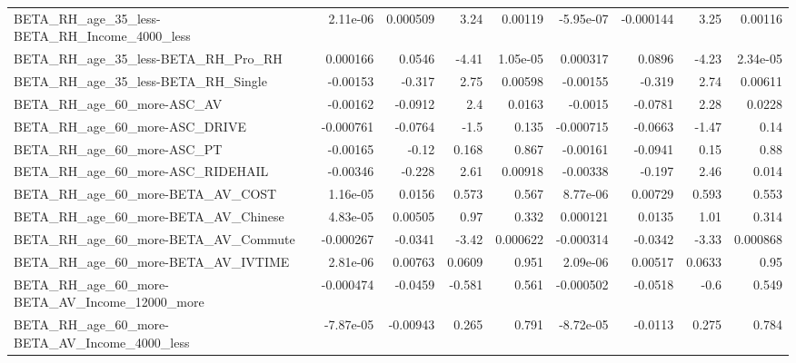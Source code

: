 \begin{tabular}{lrrrrrrrr}
BETA\_RH\_age\_35\_less-BETA\_RH\_Income\_4000\_less       &    2.11e-06 &     0.000509 &      3.24 &  0.00119 &  -5.95e-07 &   -0.000144 &         3.25 &       0.00116 \\
BETA\_RH\_age\_35\_less-BETA\_RH\_Pro\_RH                 &    0.000166 &       0.0546 &     -4.41 & 1.05e-05 &   0.000317 &      0.0896 &        -4.23 &      2.34e-05 \\
BETA\_RH\_age\_35\_less-BETA\_RH\_Single                 &    -0.00153 &       -0.317 &      2.75 &  0.00598 &   -0.00155 &      -0.319 &         2.74 &       0.00611 \\
BETA\_RH\_age\_60\_more-ASC\_AV                         &    -0.00162 &      -0.0912 &       2.4 &   0.0163 &    -0.0015 &     -0.0781 &         2.28 &        0.0228 \\
BETA\_RH\_age\_60\_more-ASC\_DRIVE                      &   -0.000761 &      -0.0764 &      -1.5 &    0.135 &  -0.000715 &     -0.0663 &        -1.47 &          0.14 \\
BETA\_RH\_age\_60\_more-ASC\_PT                         &    -0.00165 &        -0.12 &     0.168 &    0.867 &   -0.00161 &     -0.0941 &         0.15 &          0.88 \\
BETA\_RH\_age\_60\_more-ASC\_RIDEHAIL                   &    -0.00346 &       -0.228 &      2.61 &  0.00918 &   -0.00338 &      -0.197 &         2.46 &         0.014 \\
BETA\_RH\_age\_60\_more-BETA\_AV\_COST                   &    1.16e-05 &       0.0156 &     0.573 &    0.567 &   8.77e-06 &     0.00729 &        0.593 &         0.553 \\
BETA\_RH\_age\_60\_more-BETA\_AV\_Chinese                &    4.83e-05 &      0.00505 &      0.97 &    0.332 &   0.000121 &      0.0135 &         1.01 &         0.314 \\
BETA\_RH\_age\_60\_more-BETA\_AV\_Commute                &   -0.000267 &      -0.0341 &     -3.42 & 0.000622 &  -0.000314 &     -0.0342 &        -3.33 &      0.000868 \\
BETA\_RH\_age\_60\_more-BETA\_AV\_IVTIME                 &    2.81e-06 &      0.00763 &    0.0609 &    0.951 &   2.09e-06 &     0.00517 &       0.0633 &          0.95 \\
BETA\_RH\_age\_60\_more-BETA\_AV\_Income\_12000\_more      &   -0.000474 &      -0.0459 &    -0.581 &    0.561 &  -0.000502 &     -0.0518 &         -0.6 &         0.549 \\
BETA\_RH\_age\_60\_more-BETA\_AV\_Income\_4000\_less       &   -7.87e-05 &     -0.00943 &     0.265 &    0.791 &  -8.72e-05 &     -0.0113 &        0.275 &         0.784 \\

\end{tabular}
